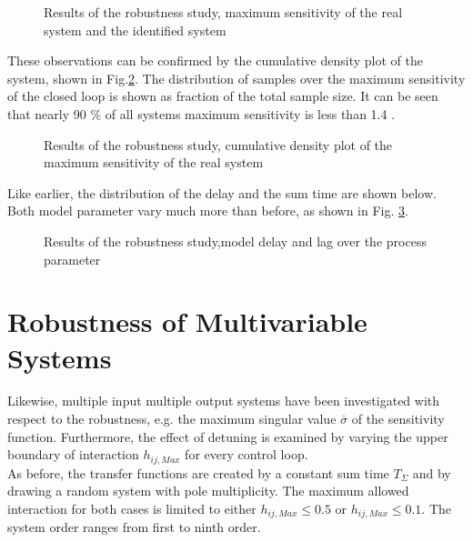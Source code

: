 \begin{figure}[H]\centering

\caption{Results of the robustness study, maximum sensitivity of the real system and the identified system}
\label{c:montecarlo:f:robustness_trand}
\end{figure}

These observations can be confirmed by the cumulative density plot of the system, shown in Fig.\ref{c:montecarlo:f:robustnesscdf_trand}. The distribution of samples over the maximum sensitivity of the closed loop is shown as fraction of the total sample size. It can be seen that nearly 90 \% of all systems maximum sensitivity is less than 1.4 .

\begin{figure}[H]\centering

\caption{Results of the robustness study, cumulative density plot of the maximum sensitivity of the real system}
\label{c:montecarlo:f:robustnesscdf_trand}
\end{figure}

Like earlier, the distribution of the delay and the sum time are shown below. Both model parameter vary much more than before, as shown in Fig.
\ref{c:montecarlo:f:parameter_trand}.

\begin{figure}[H]\centering

\caption{Results of the robustness study,model delay and lag over the process parameter}
\label{c:montecarlo:f:parameter_trand}
\end{figure}

\newpage
\section{Robustness of Multivariable Systems}
\label{c:montecarlo:s:mimo}

Likewise, multiple input multiple output systems have been investigated with respect to the robustness, e.g. the maximum singular value $\overline{\sigma}$ of the sensitivity function. Furthermore, the effect of detuning is examined by varying the upper boundary of interaction $h_{ij,Max}$ for every control loop.\\

As before, the transfer functions are created by a constant sum time $T_\Sigma$ and by drawing a random system with pole multiplicity. The maximum allowed interaction for both cases is limited to either $h_{ij,Max} \leq 0.5$ or $h_{ij,Max} \leq 0.1$. The system order ranges from first to ninth order.\\

